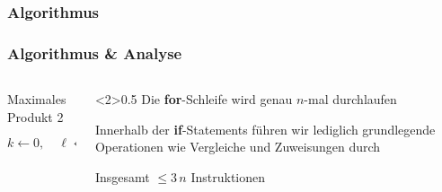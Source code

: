 \begin{frame}
\frametitle<1>{Algorithmus}
\frametitle<2>{Algorithmus \& Analyse}
\begin{columns}[T,onlytextwidth]
    \begin{column}{0.44\textwidth}
        \vspace{-5pt}
        \begin{algorithm}[H]
        	\caption{Maximales Produkt 2}
        	\label{alg:max_prod_ii}
        	\DontPrintSemicolon
        	$k \gets 0, \quad \ell \gets 0$\;
        \end{algorithm}
    \end{column}
    \begin{column}<2>{0.5\textwidth}
        Die \textbf{for}-Schleife wird genau $n$-mal durchlaufen
        
        \medskip
        
        Innerhalb der \textbf{if}-Statements f\"uhren wir lediglich grundlegende Operationen wie Vergleiche und Zuweisungen durch
        
        \medskip
        
        Insgesamt $\leq 3 \, n$ Instruktionen
    \end{column}
\end{columns}
\end{frame}

